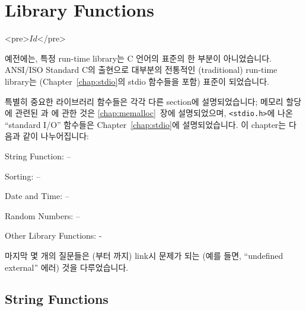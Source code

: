 \chapter{Library Functions}	\label{chap:libfunc}

\begin{rawhtml}
<pre>$Id$</pre>
\end{rawhtml}

예전에는, 특정 run-time library는 C 언어의 표준의 한 부분이 아니었습니다.
ANSI/ISO Standard C의 출현으로 대부분의 전통적인 (traditional) run-time
library는 (Chapter~\ref{chap:stdio}의 stdio 함수들을 포함) 표준이 되었습니다.

특별히 중요한 라이브러리 함수들은 각각 다른 section에 설명되었습니다; 메모리
할당에 관련된 과 에 관한 것은 \ref{chap:memalloc}~장에
설명되었으며, \verb+<stdio.h>+에 나온 ``standard I/O'' 함수들은
Chapter~\ref{chap:stdio}에 설명되었습니다.
이 chapter는 다음과 같이 나누어집니다:

\begin{description}
\item String Function: --
\item Sorting: --
\item Date and Time: --
\item Random Numbers: --
\item Other Library Functions: -
\end{description}

마지막 몇 개의 질문들은 (부터 까지) link시 문제가 되는 
(예를 들면, ``undefined external'' 에러) 것을 다루었습니다.

\section{String Functions}


